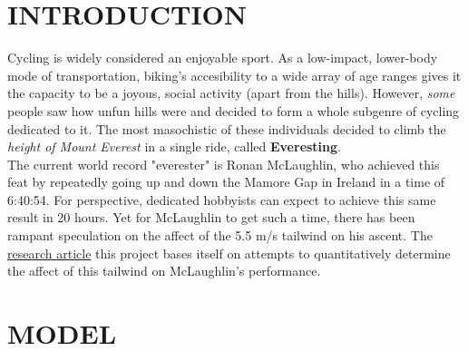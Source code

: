 \documentclass[twocolumn]{article}
\author{Gordie Novak}
\newcommand{\en}{\vspace{0.25cm}\\}
\begin{document}
\section{INTRODUCTION}
Cycling is widely considered an enjoyable sport. As a low-impact, lower-body mode of transportation, biking's accesibility to a wide array of age ranges gives it the capacity to be a joyous, social activity (apart from the hills). However, \textit{some} people saw how unfun hills were and decided to form a whole subgenre of cycling dedicated to it. The most masochistic of these individuals decided to climb the \textit{height of Mount Everest} in a single ride, called \textbf{Everesting}.\en
The current world record "everester" is Ronan McLaughlin, who achieved this feat  by repeatedly going up and down the Mamore Gap in Ireland in a time of 6:40:54. For perspective, dedicated hobbyists can expect to achieve this same result in 20 hours. Yet for McLaughlin to get such a time, there has been rampant speculation on the affect of the 5.5 m/s tailwind on his ascent. The \href{https://doi.org/10.1119/5.0131679}{research article} this project bases itself on attempts to quantitatively determine the affect of this tailwind on McLaughlin's performance. 
\section{MODEL}
\end{document}
